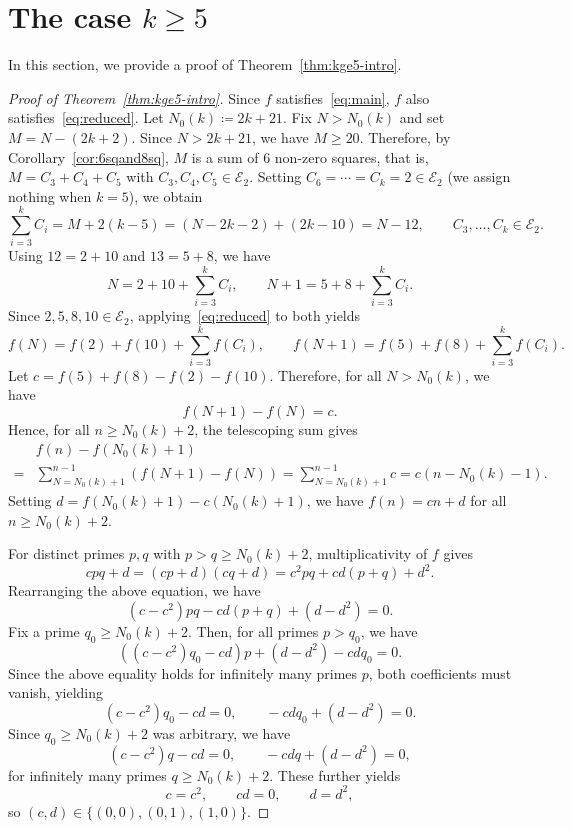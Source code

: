 \documentclass[11pt,a4paper]{amsart}
\newcommand{\E}{\mathcal{E}}
\theoremstyle{plain}
\theoremstyle{definition}
\begin{document}
\section{The case \texorpdfstring{$k \ge 5$}{k>5}}\label{sec:kge5}
In this section, we provide a proof of Theorem~\ref{thm:kge5-intro}.
\begin{proof}[Proof of Theorem~\ref{thm:kge5-intro}]
Since $f$ satisfies~\eqref{eq:main}, $f$ also satisfies~\eqref{eq:reduced}. Let $N_0(k) \coloneqq 2k + 21$. Fix $N > N_0(k)$ and set $M = N - (2k+2)$. Since $N > 2k+21$, we have $M \ge 20$. Therefore, by Corollary~\ref{cor:6sqand8sq}, $M$ is a sum of $6$ non-zero squares, that is,
$M = C_3 + C_4 + C_5$ with $C_3, C_4, C_5 \in \E_2$. Setting $C_6 = \cdots = C_k = 2 \in \E_2$
(we assign nothing when $k = 5$), we obtain
\[
    \sum_{i=3}^{k} C_i = M + 2(k-5) = (N - 2k - 2) + (2k - 10) = N - 12,
    \qquad C_3,\dots,C_k \in \E_2 .
\]
Using $12 = 2 + 10$ and $13 = 5 + 8$, we have
\[
    N = 2 + 10 + \sum_{i=3}^k C_i, \qquad N + 1 = 5 + 8 + \sum_{i=3}^k C_i .
\]
Since $2,5,8,10 \in \E_{2}$, applying~\eqref{eq:reduced} to both yields
\[
    f(N) = f(2) + f(10) + \sum_{i=3}^k f(C_i), \qquad
    f(N + 1) = f(5) + f(8) + \sum_{i=3}^k f(C_i).
\]
Let $c = f(5) + f(8) - f(2) - f(10)$. Therefore, for all $N > N_0(k)$, we have
\[
    f(N+1) - f(N) = c.
\]
Hence, for all $n \ge N_{0}(k)+2$, the telescoping sum gives
\begin{align}
    &f(n)-f(N_0(k) + 1)\\
    =&\sum_{N=N_{0}(k)+1}^{n-1}(f(N+1) - f(N)) =\sum_{N=N_{0}(k)+1}^{n-1} c=c(n-N_{0}(k)-1).
\end{align}
Setting $d = f(N_0(k) + 1) - c(N_0(k) + 1)$, we have $f(n) = cn + d$ for all $n \ge  N_0(k)+2$.


For distinct primes $p, q$ with $p > q \ge N_0(k)+2$, multiplicativity of $f$ gives
\[
    cpq + d = (cp + d)(cq + d) = c^2 pq + cd(p + q) + d^2.
\]
Rearranging the above equation, we have
\[
    (c - c^2)pq - cd(p + q) + (d - d^2) = 0.
\]
Fix a prime $q_0\ge N_0(k)+2$. Then, for all primes $p>q_0$, we have
\[
    ((c - c^2)q_{0} - cd)p + (d - d^2) -cd q_{0} = 0.
\]
Since the above equality holds for infinitely many primes $p$, both coefficients must vanish, yielding
\[
    (c - c^2)q_{0} - cd=0, \qquad -cd q_{0} + (d - d^2)=0.
\]
Since $q_0\ge N_0(k)+2$ was arbitrary, we have
\[
    (c - c^2)q - cd=0, \qquad -cd q + (d - d^2)=0,
\]
for infinitely many primes $q\ge N_0(k)+2$. These further yields
\[
    c = c^2, \qquad cd = 0, \qquad d = d^2,
\]
so $(c, d) \in \{(0,0), (0,1), (1,0)\}$.


\end{proof}
\end{document}
